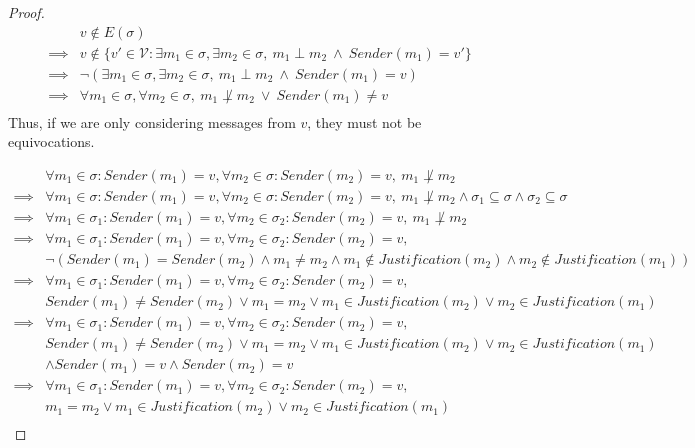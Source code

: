 \begin{proof}
  \begin{align}
          &v \notin E(\sigma) \\
  \implies&v \notin \{v' \in \mathcal{V} : \exists m_1 \in \sigma, \exists m_2 \in \sigma, ~ m_1 \perp m_2 ~ \land ~ Sender(m_1) = v' \} \\
  \implies&\neg (\exists m_1 \in \sigma, \exists m_2 \in \sigma, ~ m_1 \perp m_2 ~ \land ~ Sender(m_1) = v) \\
  \implies&\forall m_1 \in \sigma, \forall m_2 \in \sigma, ~ m_1 \not\perp m_2 ~ \lor ~ Sender(m_1) \neq v \\
  \end{align}
  Thus, if we are only considering messages from $v$, they must not be equivocations.

  \begin{align}
          &\forall m_1 \in \sigma: Sender(m_1) = v, \forall m_2 \in \sigma: Sender(m_2) = v, ~ m_1 \not\perp m_2 \\
  \implies&\forall m_1 \in \sigma: Sender(m_1) = v, \forall m_2 \in \sigma: Sender(m_2) = v, ~ m_1 \not\perp m_2 \land \sigma_1 \subseteq \sigma \land \sigma_2 \subseteq \sigma \\
  \implies&\forall m_1 \in \sigma_1: Sender(m_1) = v, \forall m_2 \in \sigma_2: Sender(m_2) = v, ~ m_1 \not\perp m_2 \\
  \implies&\forall m_1 \in \sigma_1: Sender(m_1) = v, \forall m_2 \in \sigma_2: Sender(m_2) = v, \\
          &\neg (Sender(m_1) = Sender(m_2) \land m_1 \neq m_2 \land m_1 \notin Justification(m_2) \land m_2 \notin Justification(m_1)) \\
  \implies&\forall m_1 \in \sigma_1: Sender(m_1) = v, \forall m_2 \in \sigma_2: Sender(m_2) = v, \\
          &Sender(m_1) \neq Sender(m_2) \lor m_1 = m_2 \lor m_1 \in Justification(m_2) \lor m_2 \in Justification(m_1) \\
  \implies&\forall m_1 \in \sigma_1: Sender(m_1) = v, \forall m_2 \in \sigma_2: Sender(m_2) = v, \\
          &Sender(m_1) \neq Sender(m_2) \lor m_1 = m_2 \lor m_1 \in Justification(m_2) \lor m_2 \in Justification(m_1) \\
          &\land Sender(m_1) = v \land Sender(m_2) = v \\
  \implies&\forall m_1 \in \sigma_1: Sender(m_1) = v, \forall m_2 \in \sigma_2: Sender(m_2) = v, \\
          &m_1 = m_2 \lor m_1 \in Justification(m_2) \lor m_2 \in Justification(m_1) \\

\end{align}
\end{proof}
